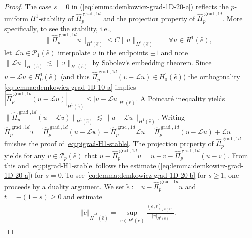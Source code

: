 \documentclass{article}
\begin{document}
\begin{proof}
The case $s = 0$ in (\ref{eq:lemma:demkowicz-grad-1D-20-a}) reflects the $p$-uniform $H^1$-stability 
of $\widehat{\Pi}_p^{\operatorname*{grad},1d}$ and the projection property of 
$\widehat{\Pi}_p^{\operatorname*{grad},1d}$. More specifically, to see the stability, i.e., 
\begin{equation}
\label{eq:pigrad-H1-stable}
\|\widehat{\Pi}_p^{\operatorname{grad},1d} u\|_{H^1(\widehat e)} \leq C \|u\|_{H^1(\widehat e)} 
\qquad \forall u \in H^1(\widehat e), 
\end{equation}
let ${\mathcal L} u \in {\mathcal P}_1(\widehat e)$
interpolate $u$ in the endpoints $\pm 1$ and note 
$\|{\mathcal L} u\|_{H^1(\widehat e)} \lesssim \|u\|_{H^1(\widehat e)}$ by Sobolev's embedding theorem. 
Since $u - {\mathcal L}u \in H^1_0(\widehat e)$ 
(and thus $\widehat \Pi_p^{\operatorname{grad},1d}(u - {\mathcal L}u) \in H^1_0(\widehat e)$) the orthogonality 
\eqref{eq:lemma:demkowicz-grad-1D-10-a} implies 
$|\widehat{\Pi}_p^{\operatorname*{grad},1d} (u  - {\mathcal L} u)|_{H^1(\widehat e)}
\leq |u  - {\mathcal L} u|_{H^1(\widehat e)}$. A Poincar\'e inequality yields 
$\|\widehat{\Pi}_p^{\operatorname*{grad},1d} (u  - {\mathcal L} u)\|_{H^1(\widehat e)}
\lesssim \|u - {\mathcal L} u\|_{H^1(\widehat e)}$. 
Writing $\widehat{\Pi}_p^{\operatorname*{grad},1d} u = 
\widehat{\Pi}_p^{\operatorname*{grad},1d} (u  - {\mathcal L} u) + 
\widehat{\Pi}_p^{\operatorname*{grad},1d} {\mathcal L} u =  
\widehat{\Pi}_p^{\operatorname*{grad},1d} (u  - {\mathcal L} u) + 
{\mathcal L} u$ finishes the proof of 
\eqref{eq:pigrad-H1-stable}. The projection property of $\widehat \Pi_p^{\operatorname{grad},1d}$ 
yields for any $v \in {\mathcal P}_p(\widehat e)$ that 
$u - \widehat \Pi_p^{\operatorname{grad},1d} u = 
u -v - \widehat \Pi_p^{\operatorname{grad},1d} (u-v)$. From this and 
\eqref{eq:pigrad-H1-stable} follows the estimate 
(\ref{eq:lemma:demkowicz-grad-1D-20-a}) for $s = 0$. 
To see 
\eqref{eq:lemma:demkowicz-grad-1D-20-b} for 
$s\ge 1$, one proceeds by a duality argument. 
We 
set $\widetilde{e}:=u-\widehat{\Pi}_p^{\operatorname*{grad},1d}u$ and $t=-(1-s)\ge 0$ and estimate 
\begin{align*}
\Vert\widetilde{e}\Vert_{\widetilde{H}^{-t}(\widehat{e})} = \operatorname*{sup}_{v\in H^t(\widehat{e})} \frac{(\widetilde{e},v)_{L^2(\widehat{e})}}{\Vert v\Vert_{H^t(\widehat{e})}}.

\end{align*}
\end{proof}
\end{document}

